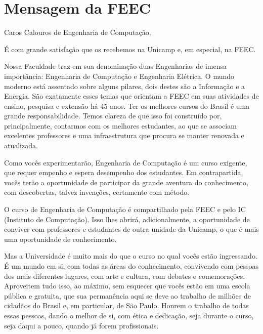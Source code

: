
\section{Mensagem da FEEC}

Caros Calouros de Engenharia de Computação,

É com grande satisfação que os recebemos na Unicamp e, em especial, na FEEC.

Nossa Faculdade traz em sua denominação duas Engenharias de imensa importância:
Engenharia de Computação e Engenharia Elétrica.  O mundo moderno está assentado
sobre alguns pilares, dois destes são a Informação e a Energia.  São exatamente
esses temas que orientam a FEEC em suas atividades de ensino, pesquisa e
extensão há 45 anos. Ter os melhores cursos do Brasil é uma grande
responsabilidade. Temos clareza de que isso foi construído por, principalmente,
contarmos com os melhores estudantes, ao que se associam excelentes professores
e uma infraestrutura que procura se manter renovada e atualizada.

Como vocês experimentarão, Engenharia de Computação é um curso exigente, que
requer empenho e espera desempenho dos estudantes. Em contrapartida, vocês terão
a oportunidade de participar da grande aventura do conhecimento, com
descobertas, talvez invenções, certamente com método.

O curso de Engenharia de Computação é compartilhado pela FEEC e pelo IC
(Instituto de Computação). Isso lhes abrirá, adicionalmente, a oportunidade de
conviver com professores e estudantes de outra unidade da Unicamp, o que é mais
uma oportunidade de conhecimento.

Mas a Universidade é muito mais do que o curso no qual vocês estão ingressando.
É um mundo em si, com todas as áreas do conhecimento, convivendo com pessoas dos
mais diferentes lugares, com arte e cultura, com debates e comemorações.
Aproveitem tudo isso, ao máximo, sem esquecer que vocês estão em uma escola
pública e gratuita, que sua permanência aqui se deve ao trabalho de milhões de
cidadãos do Brasil e, em particular, de São Paulo. Honrem o trabalho de todas
essas pessoas, dando o melhor de si, com ética e dedicação, seja durante o
curso, seja daqui a pouco, quando já forem profissionais.

